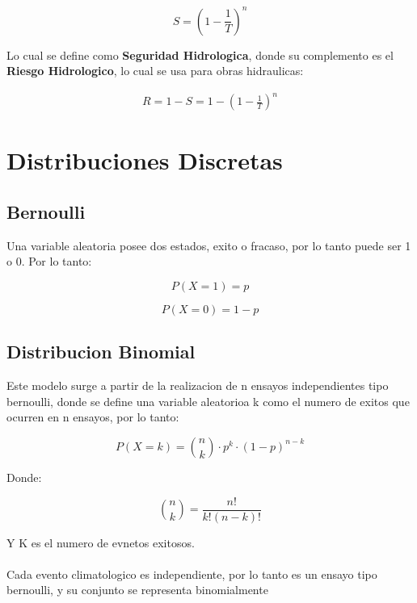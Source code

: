 \begin{equation}
    S = (1 - \frac{1}{T})^n 
\end{equation}

Lo cual se define como \textbf{Seguridad Hidrologica}, donde su complemento es el \textbf{Riesgo Hidrologico}, lo cual se usa para obras hidraulicas:

\begin{eqnarray}
    R = 1- S = 1 - (1 - \frac{1}{T})^n
\end{eqnarray}

\section{Distribuciones Discretas}

\subsection{Bernoulli}

Una variable aleatoria posee dos estados, exito o fracaso, por lo tanto puede ser 1 o 0. Por lo tanto:

\begin{equation}
    P(X = 1) = p
\end{equation}

\begin{equation}
    P(X = 0) = 1 - p
\end{equation}

\subsection{Distribucion Binomial}

Este modelo surge a partir de la realizacion de n ensayos independientes tipo bernoulli, donde se define una variable aleatorioa k como el numero de exitos que ocurren en n ensayos, por lo tanto:

\begin{equation}
    P(X = k) = \binom{n}{k} \cdot p^k \cdot (1-p)^{n-k}
\end{equation}

Donde:

\begin{equation}
    \binom{n}{k} = \frac{n!}{k!(n-k)!}
\end{equation}

Y K es el numero de evnetos exitosos.
\\ \\
Cada evento climatologico es independiente, por lo tanto es un ensayo tipo bernoulli, y su conjunto se representa binomialmente

